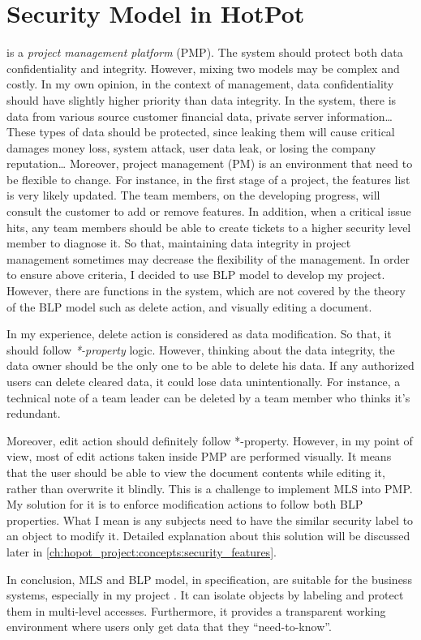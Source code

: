 
\section{Security Model in HotPot}
\label{ch:background:security_model_in_hotpot}

\myProject is a \emph{project management platform} (PMP).
The system should protect both data confidentiality and integrity.
However, mixing two models may be complex and costly.
In my own opinion, in the context of management, data confidentiality should have slightly higher priority than data integrity.
In the system, there is data from various source \eg customer financial data, private server information\dots
These types of data should be protected, since leaking them will cause critical damages \eg money loss, system attack, user data leak, or losing the company reputation\dots 
Moreover, project management (PM) is an environment that need to be flexible to change. 
For instance, in the first stage of a project, the features list is very likely updated.
The team members, on the developing progress, will consult the customer to add or remove features.
In addition, when a critical issue hits, any team members should be able to create tickets to a higher security level member to diagnose it.
So that, maintaining data integrity in project management sometimes may decrease the flexibility of the management.
In order to ensure above criteria, I decided to use BLP model to develop my project.
However, there are functions in the system, which are not covered by the theory of the BLP model such as delete action, and visually editing a document.

In my experience, delete action is considered as data modification.
So that, it should follow \emph{*-property} logic.
However, thinking about the data integrity, the data owner should be the only one to be able to delete his data.
If any authorized users can delete cleared data, it could lose data unintentionally.
For instance, a technical note of a team leader can be deleted by a team member who thinks it's redundant.

Moreover, edit action should definitely follow *-property.
However, in my point of view, most of edit actions taken inside PMP are performed visually.
It means that the user should be able to view the document contents while editing it, rather than overwrite it blindly.
This is a challenge to implement MLS into PMP.
My solution for it is to enforce modification actions to follow both BLP properties.
What I mean is any subjects need to have the similar security label to an object to modify it.
Detailed explanation about this solution will be discussed later in \autoref{ch:hopot_project:concepts:security_features}.

In conclusion, MLS and BLP model, in specification, are suitable for the business systems, especially in my project \myProject.
It can isolate objects by labeling and protect them in multi-level accesses.
Furthermore, it provides a transparent working environment where users only get data that they ``need-to-know''.
